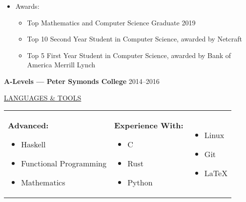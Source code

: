 \documentclass[10pt]{letter}
\newif\iflong
\begin{document}
\begin{itemize}
  \item Awards:
        \begin{itemize}
          \setlength\itemsep{0pt}
          \item Top Mathematics and Computer Science Graduate 2019
          \item Top 10 Second Year Student in Computer Science, awarded by Netcraft
          \item Top 5 First Year Student in Computer Science, awarded by Bank of America Merrill Lynch
        \end{itemize}
\end{itemize}
\fi

\textbf{A-Levels --- Peter Symonds College} \hfill 2014--2016

\iflong
\vspace{-5pt}
\begin{itemize}
  \setlength\itemsep{0pt}
  \item Mathematics A*
  \item Further Mathematics A
  \item Physics A
  \item (AS) Economics A
\end{itemize}
\fi


\vspace{10pt}

\uline{{\large LANGUAGES \& TOOLS}\hfill}

\vspace{5pt}

\begin{tabular}{p{}p{}p{}}
  \textbf{Advanced:}
  \begin{itemize}
    \setlength\itemsep{0pt}
    \item Haskell
    \item Functional Programming
    \item Mathematics
  \end{itemize}

   &
  \textbf{Experience With:}
  \begin{itemize}
    \setlength\itemsep{0pt}
    \item C
    \item Rust
    \item Python
  \end{itemize}

   &
   \begin{itemize}
     \setlength\itemsep{0pt}
     \item Linux
     \item Git
     \item \LaTeX{}
   \end{itemize}
\end{tabular}
\end{document}
